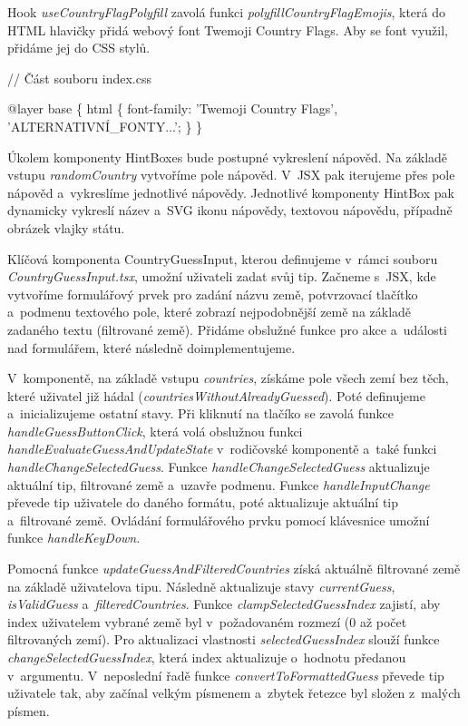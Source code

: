 Hook \emph{useCountryFlagPolyfill} zavolá funkci \emph{polyfillCountryFlagEmojis}, která do HTML hlavičky přidá webový font Twemoji Country Flags. Aby se font využil, přidáme jej do CSS stylů.

\begin{prog}
// Část souboru index.css

@layer base \{
  html \{
    font-family: 'Twemoji Country Flags', 'ALTERNATIVNÍ_FONTY...';
  \}
\}
\end{prog}

Úkolem komponenty HintBoxes bude postupné vykreslení nápověd. Na základě vstupu \emph{randomCountry} vytvoříme pole nápověd. V~JSX pak iterujeme přes pole nápověd a~vykreslíme jednotlivé nápovědy. 
Jednotlivé komponenty HintBox pak dynamicky vykreslí název a~SVG ikonu nápovědy, textovou nápovědu, případně obrázek vlajky státu.

Klíčová komponenta CountryGuessInput, kterou definujeme v~rámci souboru \emph{CountryGuessInput.tsx}, umožní uživateli zadat svůj tip. 
Začneme s~JSX, kde vytvoříme formulářový prvek pro zadání názvu země, potvrzovací tlačítko a~podmenu textového pole, které zobrazí nejpodobnější země na základě zadaného textu (filtrované země). 
Přidáme obslužné funkce pro akce a~události nad formulářem, které následně doimplementujeme.

V~komponentě, na základě vstupu \emph{countries}, získáme pole všech zemí bez těch, které uživatel již hádal (\emph{countriesWithoutAlreadyGuessed}). Poté definujeme a~inicializujeme ostatní stavy. 
Při kliknutí na tlačíko se zavolá funkce \emph{handleGuessButtonClick}, která volá obslužnou funkci \emph{handleEvaluateGuessAndUpdateState} v~rodičovské komponentě a~také funkci \emph{handleChangeSelectedGuess}. 
Funkce \emph{handleChangeSelectedGuess} aktualizuje aktuální tip, filtrované země a~uzavře podmenu. Funkce \emph{handleInputChange} převede tip uživatele do daného formátu, poté aktualizuje aktuální tip a~filtrované země. 
Ovládání formulářového prvku pomocí klávesnice umožní funkce \emph{handleKeyDown}.

Pomocná funkce \emph{updateGuessAndFilteredCountries} získá aktuálně filtrované země na základě uživatelova tipu. Následně aktualizuje stavy \emph{currentGuess}, \emph{isValidGuess} a~\emph{filteredCountries}. 
Funkce \emph{clampSelectedGuessIndex} zajistí, aby index uživatelem vybrané země byl v~požadovaném rozmezí (0 až počet filtrovaných zemí). 
Pro aktualizaci vlastnosti \emph{selectedGuessIndex} slouží funkce \emph{changeSelectedGuessIndex}, která index aktualizuje o~hodnotu předanou v~argumentu.
V~neposlední řadě funkce \emph{convertToFormattedGuess} převede tip uživatele tak, aby začínal velkým písmenem a~zbytek řetezce byl složen z~malých písmen.


